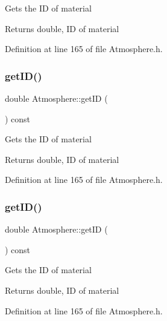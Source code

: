 Gets the ID of material \begin{DoxyReturn}{Returns}
double, ID of material 
\end{DoxyReturn}


Definition at line 165 of file Atmosphere.\+h.

\mbox{\label{class_atmosphere_a4dfda799563c28438db1b23cbee6e099}} 
\subsubsection{\texorpdfstring{get\+I\+D()}{getID()}\hspace{0.1cm}{\footnotesize\ttfamily [2/3]}}
{\footnotesize\ttfamily double Atmosphere\+::get\+ID (\begin{DoxyParamCaption}{ }\end{DoxyParamCaption}) const\hspace{0.3cm}{\ttfamily [inline]}}

Gets the ID of material \begin{DoxyReturn}{Returns}
double, ID of material 
\end{DoxyReturn}


Definition at line 165 of file Atmosphere.\+h.

\mbox{\label{class_atmosphere_a4dfda799563c28438db1b23cbee6e099}} 
\subsubsection{\texorpdfstring{get\+I\+D()}{getID()}\hspace{0.1cm}{\footnotesize\ttfamily [3/3]}}
{\footnotesize\ttfamily double Atmosphere\+::get\+ID (\begin{DoxyParamCaption}{ }\end{DoxyParamCaption}) const\hspace{0.3cm}{\ttfamily [inline]}}

Gets the ID of material \begin{DoxyReturn}{Returns}
double, ID of material 
\end{DoxyReturn}


Definition at line 165 of file Atmosphere.\+h.

\mbox{\label{class_atmosphere_acb944a3a99cd40f0132713ce73e6ca4a}} 

